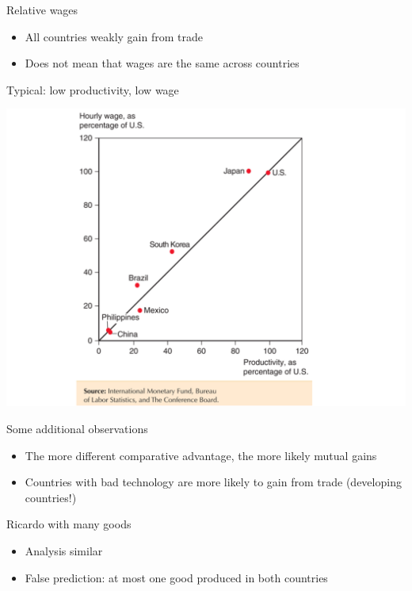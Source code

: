 \documentclass[ignorenonframetext,]{beamer}
\begin{document}
\begin{frame}{Relative wages}

    \begin{itemize}
        \item All countries weakly gain from trade
        \item Does not mean that wages are the same across countries 
    \end{itemize}

\end{frame}

\begin{frame}{Typical: low productivity, low wage}

    \includegraphics[scale=0.25]{low_prod_low_wage.png}

\end{frame}

\begin{frame}{Some additional observations}

    \begin{itemize}
        \item The more different comparative advantage, the more likely mutual gains
        \item Countries with bad technology are more likely to gain from trade (developing countries!)
    \end{itemize}

\end{frame}

\begin{frame}{Ricardo with many goods}

    \begin{itemize}
        \item Analysis similar
        \item False prediction: at most one good produced in both countries
    \end{itemize}

\end{frame}
\end{document}
